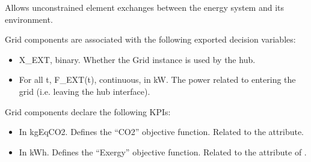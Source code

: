 \documentclass[letterpaper,10pt,english]{sphinxmanual}
\begin{document}
\begin{fulllineitems}
\label{\detokenize{generated/tamos.elementIO.Grid:tamos.elementIO.Grid}}
\pysigstartsignatures
{}
\pysigstopsignatures{}

\begin{fulllineitems}
\label{\detokenize{generated/tamos.elementIO.Grid:tamos.elementIO.Grid.__init__}}
\pysigstartsignatures
{}
\pysigstopsignatures
\sphinxAtStartPar
Allows unconstrained element exchanges between the energy system and its environment.

\sphinxAtStartPar
Grid components are associated with the following exported decision variables:
\begin{itemize}
\item {} 
\sphinxAtStartPar
X\_EXT, binary.
Whether the Grid instance is used by the hub.

\item {} 
\sphinxAtStartPar
For all t, F\_EXT(t), continuous, in kW.
The power related to  entering the grid (i.e. leaving the hub interface).

\end{itemize}

\sphinxAtStartPar
Grid components declare the following KPIs:
\begin{itemize}
\item {} 
\sphinxAtStartPar
{}
In kgEqCO2.
Defines the “CO2” objective function. Related to the  attribute.

\item {} 
\sphinxAtStartPar
{}
In kWh.
Defines the “Exergy” objective function. Related to the  attribute of .


\end{itemize}
\end{fulllineitems}
\end{fulllineitems}
\end{document}
